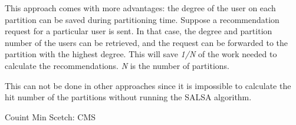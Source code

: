 This approach comes with more advantages: the degree of the user on each partition can be saved during partitioning time. Suppose a recommendation request for a particular user is sent. In that case, the degree and partition number of the users can be retrieved, and the request can be forwarded to the partition with the highest degree. This will save \emph{1/N} of the work needed to calculate the recommendations. \emph{N} is the number of partitions. 

This can not be done in other approaches since it is impossible to calculate the hit number of the partitions without running the SALSA algorithm.

Couint Min Scetch: CMS \cite{cormode2005improved}